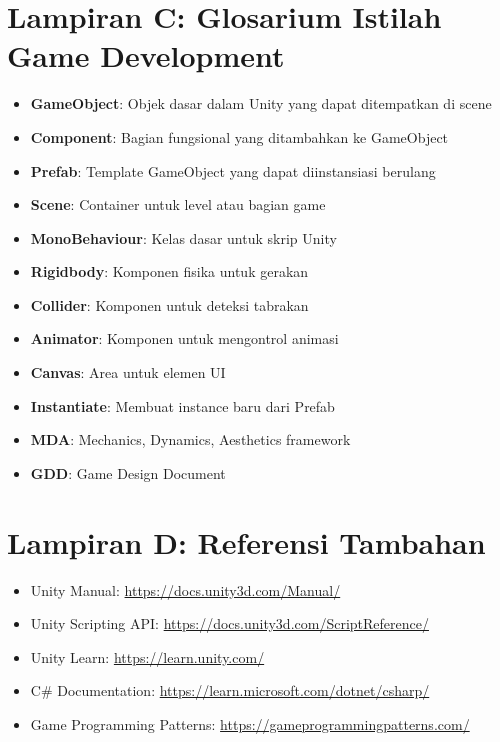 \section*{Lampiran C: Glosarium Istilah Game Development}
\begin{itemize}
  \item \textbf{GameObject}: Objek dasar dalam Unity yang dapat ditempatkan di scene
  \item \textbf{Component}: Bagian fungsional yang ditambahkan ke GameObject
  \item \textbf{Prefab}: Template GameObject yang dapat diinstansiasi berulang
  \item \textbf{Scene}: Container untuk level atau bagian game
  \item \textbf{MonoBehaviour}: Kelas dasar untuk skrip Unity
  \item \textbf{Rigidbody}: Komponen fisika untuk gerakan
  \item \textbf{Collider}: Komponen untuk deteksi tabrakan
  \item \textbf{Animator}: Komponen untuk mengontrol animasi
  \item \textbf{Canvas}: Area untuk elemen UI
  \item \textbf{Instantiate}: Membuat instance baru dari Prefab
  \item \textbf{MDA}: Mechanics, Dynamics, Aesthetics framework
  \item \textbf{GDD}: Game Design Document
\end{itemize}

\section*{Lampiran D: Referensi Tambahan}
\begin{itemize}
  \item Unity Manual: \url{https://docs.unity3d.com/Manual/}
  \item Unity Scripting API: \url{https://docs.unity3d.com/ScriptReference/}
  \item Unity Learn: \url{https://learn.unity.com/}
  \item C\# Documentation: \url{https://learn.microsoft.com/dotnet/csharp/}
  \item Game Programming Patterns: \url{https://gameprogrammingpatterns.com/}
\end{itemize}
